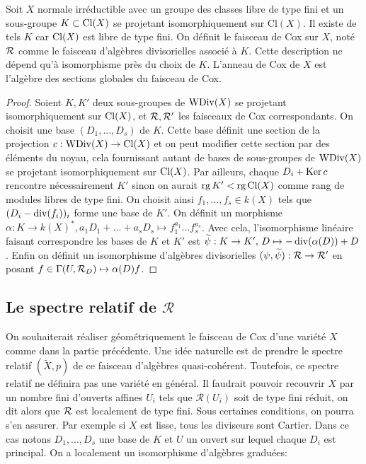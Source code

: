 \begin{cons}
Soit $X$ normale irréductible avec un groupe des classes libre de type fini et un sous-groupe $K\subset \operatorname{Cl}(X)$ se projetant isomorphiquement sur Cl$(X)$. Il existe de tels $K$ car $\operatorname{Cl}(X)$ est libre de type fini. On définit le faisceau de Cox sur $X$, noté $\mathcal{R}$ comme le faisceau d'algèbres divisorielles associé à $K$. Cette description ne dépend qu'à isomorphisme près du choix de $K$. L'anneau de Cox de $X$ est l'algèbre des sections globales du faisceau de Cox. 
\end{cons}
\begin{proof}
Soient $K,K'$ deux sous-groupes de $\operatorname{WDiv}(X)$ se projetant isomorphiquement sur $\operatorname{Cl}(X)$, et $\mathcal{R},\mathcal{R}'$ les faisceaux de Cox correspondants. On choisit une base $(D_1,...,D_s)$ de $K$. Cette base définit une section de la projection $c:\operatorname{WDiv}(X)\rightarrow \operatorname{Cl}(X)$ et on peut modifier cette section par des éléments du noyau, cela fournissant autant de bases de sous-groupes de $\operatorname{WDiv}(X)$ se projetant isomorphiquement sur $\operatorname{Cl}(X)$. Par ailleurs, chaque $D_i+\operatorname{Ker} c$ rencontre nécessairement $K'$ sinon on aurait $\operatorname{rg} K' < \operatorname{rg} \operatorname{Cl}(X)$ comme rang de modules libres de type fini. On choisit ainsi $f_1,...,f_s\in k(X)$ tels que $(D_i-\operatorname{div}(f_i))_i$ forme une base de $K'$. On définit un morphisme $\alpha:K\rightarrow k(X)^*, a_1D_1+...+a_sD_s\mapsto f_1^{a_1}...f_s^{a_s}$. Avec cela, l'isomorphisme linéaire faisant correspondre les bases de $K$ et $K'$ est $\widetilde{\psi}:K\rightarrow K',\, D\mapsto -\operatorname{div}(\alpha(D))+D$. Enfin on définit un isomorphisme d'algèbres divisorielles $(\psi, \widetilde{\psi}): \mathcal{R}\rightarrow\mathcal{R}'$ en posant $f\in \Gamma(U, \mathcal{R}_D)\mapsto \alpha(D)f$.
\end{proof}



\subsection{Le spectre relatif de $\mathcal{R}$}

On souhaiterait réaliser géométriquement le faisceau de Cox d'une variété $X$ comme dans la partie précédente. Une idée naturelle est de prendre le spectre relatif $(\widetilde{X}, p)$ de ce faisceau d'algèbres quasi-cohérent. Toutefois, ce spectre relatif ne définira pas une variété en général. Il faudrait pouvoir recouvrir $X$ par un nombre fini d'ouverts affines $U_i$ tels que $\mathcal{R}(U_i)$ soit de type fini réduit, on dit alors que $\mathcal{R}$ est localement de type fini. Sous certaines conditions, on pourra s'en assurer. Par exemple si $X$ est lisse, tous les diviseurs sont Cartier. Dans ce cas notons $D_1,...,D_s$ une base de $K$ et $U$ un ouvert sur lequel chaque $D_i$ est principal. On a localement un isomorphisme d'algèbres graduées:

